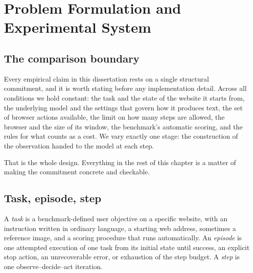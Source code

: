 \chapter{Problem Formulation and Experimental System}
\label{ch:system}


\section{The comparison boundary}
\label{sec:boundary}

Every empirical claim in this dissertation rests on a single structural
commitment, and it is worth stating before any implementation detail. Across
all conditions we hold constant: the task and the state of the website it
starts from, the underlying model and the settings that govern how it produces
text, the set of browser actions available, the limit on how many steps are
allowed, the browser and the size of its window, the benchmark's automatic
scoring, and the rules for what counts as a cost. We vary exactly one stage: the construction of the observation handed to the model at each step.

That is the whole design. Everything in the rest of this chapter is a matter of
making the commitment concrete and checkable.

\FloatBarrier
\section{Task, episode, step}
\label{sec:task-def}

A \emph{task} is a benchmark-defined user objective on a specific website, with
an instruction written in ordinary language, a starting web address, sometimes
a reference image, and a scoring procedure that runs automatically. An \emph{episode} is one attempted execution of one task
from its initial state until success, an explicit stop action, an unrecoverable
error, or exhaustion of the step budget. A \emph{step} is one
observe--decide--act iteration.

